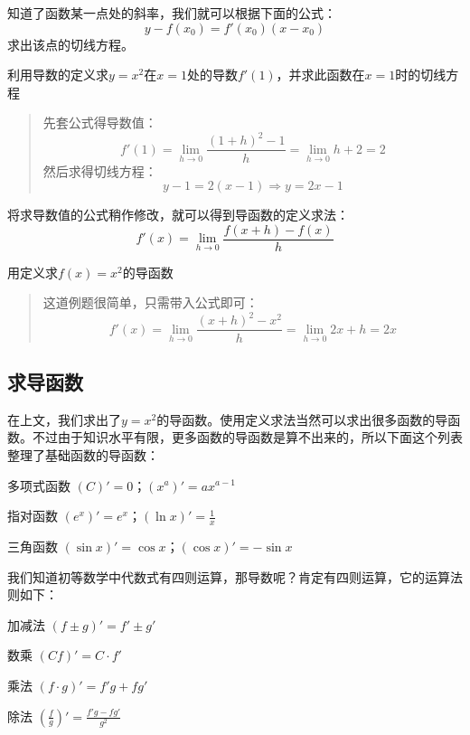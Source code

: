 知道了函数某一点处的斜率，我们就可以根据下面的公式：\[y-f(x_0)=f'(x_0)(x-x_0)\]求出该点的切线方程。

\begin{example}
	利用导数的定义求$y=x^2$在$x=1$处的导数$f'(1)$，并求此函数在$x=1$时的切线方程

	\begin{quote}
		先套公式得导数值：\[f'(1)=\lim_{h\rightarrow 0}\frac{(1+h)^2-1}{h}=\lim_{h\rightarrow 0}h+2=2\]
		然后求得切线方程：\[y-1=2(x-1)\Rightarrow y=2x-1\]
	\end{quote}
\end{example}

将求导数值的公式稍作修改，就可以得到导函数的定义求法：\[f'(x)=\lim_{h\rightarrow 0}\frac{f(x+h)-f(x)}{h}\]

\begin{example}
	用定义求$f(x)=x^2$的导函数

	\begin{quote}
		这道例题很简单，只需带入公式即可：\[f'(x)=\lim_{h\rightarrow 0}\frac{(x+h)^2-x^2}{h}=\lim_{h\rightarrow 0}2x+h=2x\]
	\end{quote}
\end{example}

\subsection{求导函数}
在上文，我们求出了$y=x^2$的导函数。使用定义求法当然可以求出很多函数的导函数。不过由于知识水平有限，更多函数的导函数是算不出来的，所以下面这个列表整理了基础函数的导函数：

\begin{desclist}
	\item[多项式函数] $(C)'=0$；$(x^a)'=ax^{a-1}$
	\item[指对函数] $(e^x)'=e^x$；$(\ln x)'=\frac{1}{x}$
	\item[三角函数] $(\sin x)'=\cos x$；$(\cos x)'=-\sin x$
\end{desclist}

我们知道初等数学中代数式有四则运算，那导数呢？肯定有四则运算，它的运算法则如下：

\begin{desclist}
	\item[加减法] $(f\pm g)'=f'\pm g'$
	\item[数乘] $(Cf)'=C\cdot f'$
	\item[乘法] $(f\cdot g)'=f'g+fg'$
	\item[除法] $(\frac{f}{g})'=\frac{f'g-fg'}{g^2}$
\end{desclist}

